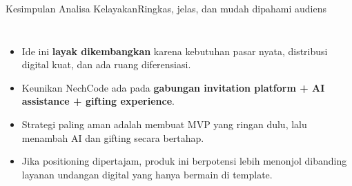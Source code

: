 \documentclass[aspectratio=169,11pt]{beamer}
\begin{document}
\begin{frame}{Kesimpulan Analisa Kelayakan}{Ringkas, jelas, dan mudah dipahami audiens}
\begin{columns}[T,totalwidth=\textwidth]
\begin{itemize}
  \item Ide ini \textbf{layak dikembangkan} karena kebutuhan pasar nyata, distribusi digital kuat, dan ada ruang diferensiasi.
  \item Keunikan NechCode ada pada \textbf{gabungan invitation platform + AI assistance + gifting experience}.
  \item Strategi paling aman adalah membuat MVP yang ringan dulu, lalu menambah AI dan gifting secara bertahap.
  \item Jika positioning dipertajam, produk ini berpotensi lebih menonjol dibanding layanan undangan digital yang hanya bermain di template.
\end{itemize}

\end{columns}
\end{frame}
\end{document}
